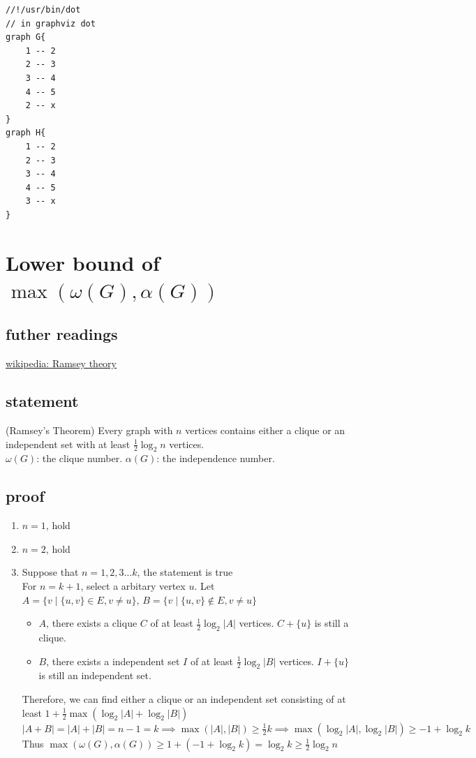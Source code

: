 \documentclass{article}
\begin{document}
\begin{verbatim}
//!/usr/bin/dot
// in graphviz dot
graph G{
	1 -- 2
	2 -- 3
	3 -- 4
	4 -- 5
	2 -- x
}
graph H{
	1 -- 2
	2 -- 3
	3 -- 4
	4 -- 5
	3 -- x
}
\end{verbatim}


\newpage
\section{Lower bound of $\max(\omega(G),\alpha(G))$}

\subsection{futher readings}
\href{https://en.wikipedia.org/wiki/Ramsey_theory}{wikipedia: Ramsey theory}

\subsection{statement}

(Ramsey's Theorem) Every graph with $n$ vertices contains either a clique or an independent set with at least $\frac{1}{2}\log_2 n$ vertices.\\
$\omega(G)$: the clique number.
$\alpha(G)$: the independence number.

\subsection{proof}

\begin{enumerate}
	\item $n=1$, hold
	\item $n=2$, hold
	\item Suppose that $n=1,2,3\ldots k$, the statement is true\\
	      For $n=k+1$, select a arbitary vertex $u$.
	      Let $A=\{v\mid \{u,v\}\in E,v\neq u\},\, B=\{v\mid \{u,v\}\not\in E,v\neq u\}$
	      \begin{itemize}
		      \item $A$, there exists a clique $C$ of at least $\frac{1}{2}\log_2 |A|$ vertices.
		            $C+\{u\}$ is still a clique.
		      \item $B$, there exists a independent set $I$ of at least $\frac{1}{2}\log_2 |B|$ vertices.
		            $I+\{u\}$ is still an independent set.
	      \end{itemize}
	      Therefore, we can find either a clique or an independent set consisting of at least $1+\frac{1}{2}\max\left(\log_2 |A|+\log_2 |B|\right)$\\
	      $|A+B|=|A|+|B|=n-1=k\implies \max(|A|,|B|)\geq \frac{1}{2}k\implies \max\left(\log_2 |A|,\log_2 |B|\right)\geq -1+\log_2 k$\\
	      Thus $\max(\omega(G),\alpha(G))\geq 1+\left(-1+\log_2 k\right)=\log_2 k\geq \frac{1}{2}\log_2 n$
\end{enumerate}
\end{document}
